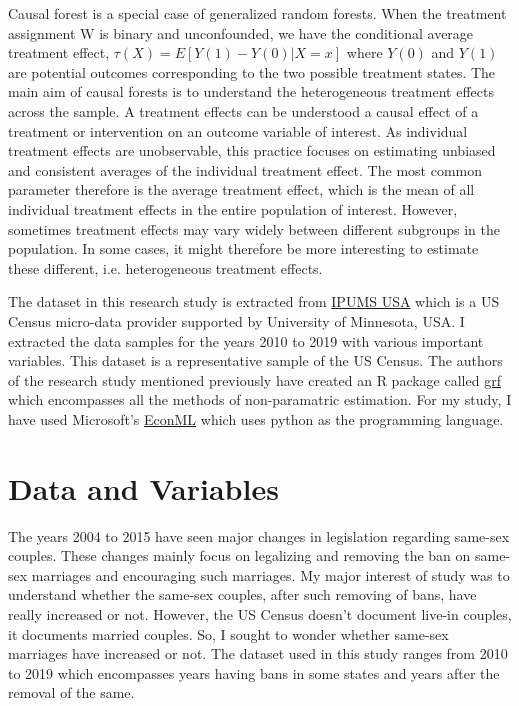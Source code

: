 \documentclass[11pt, a4paper, leqno]{article}
\begin{document}
Causal forest is a special case of generalized random forests. When the treatment assignment W is binary and unconfounded, we have the 
conditional average treatment effect, $\tau(X) = E[Y(1) - Y(0) | X = x]$ where $Y(0)$ and $Y(1)$ are potential outcomes corresponding to the 
two possible treatment states. The main aim of causal forests is to understand the heterogeneous treatment effects across the sample. A 
treatment effects can be understood a causal effect of a treatment or intervention on an outcome variable of interest.  As individual treatment 
effects are unobservable, this practice focuses on estimating unbiased and consistent averages of the individual treatment effect. The most 
common parameter therefore is the average treatment effect, which is the mean of all individual treatment effects in the entire population of 
interest. However, sometimes treatment effects may vary widely between different subgroups in the population. In some cases, it might therefore 
be more interesting to estimate these different, i.e. heterogeneous treatment effects.

 The dataset in this research study is extracted from \href{https://usa.ipums.org/usa/index.shtml}{IPUMS USA} which is a US Census micro-data 
 provider supported by University of Minnesota, USA. I extracted the data samples for the years 2010 to 2019 with various important variables. 
 This dataset is a representative sample of the US Census. The authors of the research study mentioned previously have created an R package 
 called \href{https://github.com/grf-labs/grf}{grf} which encompasses all the methods of non-paramatric estimation. For my study, I have used 
 Microsoft's \href{https://github.com/py-why/EconML}{EconML} which uses python as the programming language.



 \section{Data and Variables} %
\label{sec:Data and Variables}

The years 2004 to 2015 have seen major changes in legislation regarding same-sex couples. These changes mainly focus on legalizing and removing 
the ban on same-sex marriages and encouraging such marriages. My major interest of study was to understand whether the same-sex couples, after 
such removing of bans, have really increased or not. However, the US Census doesn't document live-in couples, it documents married couples. So, 
I sought to wonder whether same-sex marriages have increased or not. The dataset used in this study ranges from 2010 to 2019 which encompasses 
years having bans in some states and years after the removal of the same.
\end{document}
